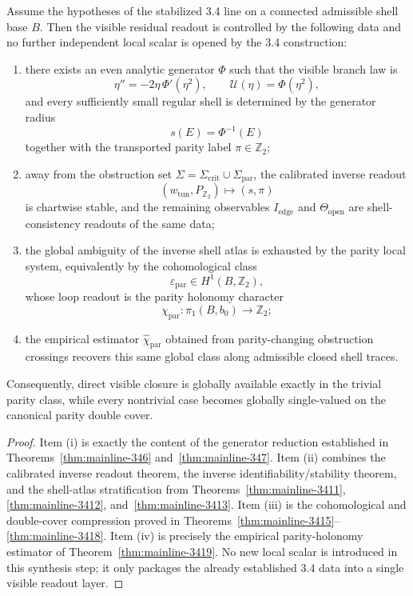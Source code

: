 \begin{theorem}
\label{thm:mainline-3420}
Assume the hypotheses of the stabilized 3.4 line on a connected admissible shell base $B$. Then the visible residual readout is controlled by the following data and no further independent local scalar is opened by the 3.4 construction:
\begin{enumerate}[label=(\roman*), leftmargin=2em]
  \item there exists an even analytic generator $\Phi$ such that the visible branch law is
  \[
    \eta'' = -2\eta\,\Phi'(\eta^2),
    \qquad
    \mathcal U(\eta)=\Phi(\eta^2),
  \]
  and every sufficiently small regular shell is determined by the generator radius
  \[
    s(E)=\Phi^{-1}(E)
  \]
  together with the transported parity label $\pi\in\mathbb Z_2$;

  \item away from the obstruction set $\Sigma=\Sigma_{\mathrm{crit}}\cup\Sigma_{\mathrm{par}}$, the calibrated inverse readout
  \[
    (w_{\mathrm{tun}},P_{\mathbb Z_2})\longmapsto (s,\pi)
  \]
  is chartwise stable, and the remaining observables $I_{\mathrm{edge}}$ and $\Theta_{\mathrm{open}}$ are shell-consistency readouts of the same data;

  \item the global ambiguity of the inverse shell atlas is exhausted by the parity local system, equivalently by the cohomological class
  \[
    \varepsilon_{\mathrm{par}}\in H^1(B,\mathbb Z_2),
  \]
  whose loop readout is the parity holonomy character
  \[
    \chi_{\mathrm{par}}:\pi_1(B,b_0)\to\mathbb Z_2;
  \]

  \item the empirical estimator $\widehat\chi_{\mathrm{par}}$ obtained from parity-changing obstruction crossings recovers this same global class along admissible closed shell traces.
\end{enumerate}
Consequently, direct visible closure is globally available exactly in the trivial parity class, while every nontrivial case becomes globally single-valued on the canonical parity double cover.
\end{theorem}

\begin{proof}
Item (i) is exactly the content of the generator reduction established in Theorems~\ref{thm:mainline-346} and~\ref{thm:mainline-347}. Item (ii) combines the calibrated inverse readout theorem, the inverse identifiability/stability theorem, and the shell-atlas stratification from Theorems~\ref{thm:mainline-3411}, \ref{thm:mainline-3412}, and~\ref{thm:mainline-3413}. Item (iii) is the cohomological and double-cover compression proved in Theorems~\ref{thm:mainline-3415}--\ref{thm:mainline-3418}. Item (iv) is precisely the empirical parity-holonomy estimator of Theorem~\ref{thm:mainline-3419}. No new local scalar is introduced in this synthesis step; it only packages the already established 3.4 data into a single visible readout layer.
\end{proof}


